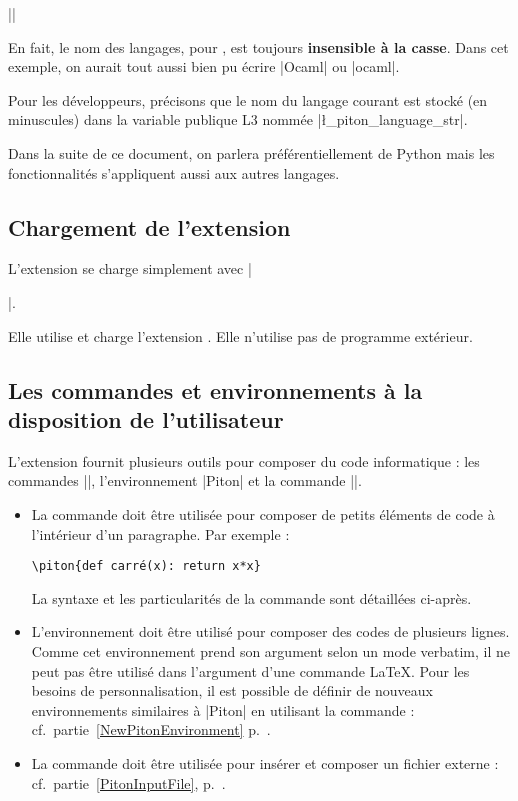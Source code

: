 \documentclass[dvipsnames,svgnames]{article}
\begin{document}
\smallskip
||

\smallskip
En fait, le nom des langages, pour , est toujours \textbf{insensible à la
  casse}. Dans cet exemple, on aurait tout aussi bien pu écrire |Ocaml| ou |ocaml|.

\smallskip
Pour les développeurs, précisons que le nom du langage courant est stocké (en minuscules)
dans la variable publique L3 nommée |\l_piton_language_str|.

\smallskip
Dans la suite de ce document, on parlera préférentiellement de Python mais les
fonctionnalités s'appliquent aussi aux autres langages.



\subsection{Chargement de l'extension}


L'extension  se charge simplement avec |\usepackage{piton}|.

\smallskip
Elle utilise et charge l'extension . Elle n'utilise pas de programme
extérieur. 

\subsection{Les commandes et environnements à la disposition de l'utilisateur}


L'extension  fournit plusieurs outils pour composer du code informatique : les
commandes |\piton|, l'environnement |{Piton}| et la commande |\PitonInputFile|.

\begin{itemize} 
\item La commande  doit être utilisée
pour composer de petits éléments de code à l'intérieur d'un paragraphe. Par exemple :

{\color{gray}\verb|\piton{def carré(x): return x*x}|}\qquad 
{}

La syntaxe et les particularités de la commande sont détaillées ci-après.


\item L'environnement  doit être utilisé pour 
composer des codes de plusieurs lignes. Comme cet environnement prend son argument selon
un mode verbatim, il ne peut pas être utilisé dans l'argument d'une commande LaTeX. Pour
les besoins de personnalisation, il est possible de définir de nouveaux environnements
similaires à |{Piton}| en utilisant la commande  :
cf.~partie~\ref{NewPitonEnvironment} p.~\pageref{NewPitonEnvironment}.

\item La commande  doit être utilisée pour insérer et
composer un fichier externe : cf.~partie~\ref{PitonInputFile},
p.~\pageref{PitonInputFile}.
\end{itemize}
\end{document}
